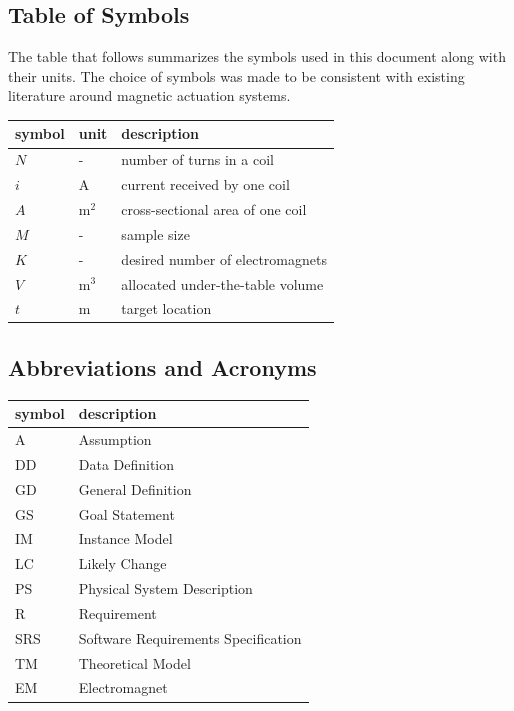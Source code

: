 \documentclass[12pt]{article}
\begin{document}
\subsection{Table of Symbols}

The table that follows summarizes the symbols used in this document along with
their units.  The choice of symbols was made to be consistent with existing literature around magnetic actuation systems.

\renewcommand{\arraystretch}{1.2}
\noindent \begin{longtable*}{l l p{12cm}} \toprule
\textbf{symbol} & \textbf{unit} & \textbf{description}\\
\midrule 
$N$ & - & number of turns in a coil
\\
$i$ & \si{\ampere} & current received by one coil
\\
$A$ & \si{\metre}$^2$ & cross-sectional area of one coil
\\
$M$ & - & sample size
\\
$K$ & - & desired number of electromagnets 
\\
$V$ & \si{\metre}$^3$ & allocated under-the-table volume
\\
$t$ & \si{\metre} & target location
\\
\bottomrule
\end{longtable*}


\subsection{Abbreviations and Acronyms}

\renewcommand{\arraystretch}{1.2}
\begin{tabular}{l l} 
  \toprule		
  \textbf{symbol} & \textbf{description}\\
  \midrule 
  A & Assumption\\
  DD & Data Definition\\
  GD & General Definition\\
  GS & Goal Statement\\
  IM & Instance Model\\
  LC & Likely Change\\
  PS & Physical System Description\\
  R & Requirement\\
  SRS & Software Requirements Specification\\
  TM & Theoretical Model\\
  EM & Electromagnet \\
  \bottomrule
\end{tabular}\\
\end{document}
